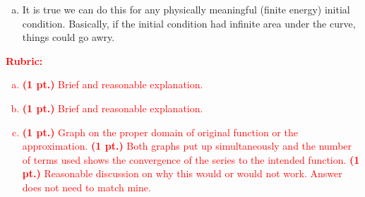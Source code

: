 \documentclass[12pt]{article} %
\begin{document}
\begin{solution}
\begin{enumerate}[(a)]
\item It is true we can do this for any physically meaningful (finite energy) initial condition. Basically, if the initial condition had infinite area under the curve, things could go awry. 
\end{enumerate}
\end{solution}
\vspace*{1cm}
\textcolor{red}{
\noindent \textbf{Rubric:}
\begin{enumerate}[(a)]
    \item \textbf{(1 pt.)} Brief and reasonable explanation.
    \item \textbf{(1 pt.)} Brief and reasonable explanation.
    \item \textbf{(1 pt.)} Graph on the proper domain of original function or the approximation. \textbf{(1 pt.)} Both graphs put up simultaneously and the number of terms used shows the convergence of the series to the intended function.
	\textbf{(1 pt.)} Reasonable discussion on why this would or would not work. Answer does not need to match mine.
\end{enumerate}
}
\end{document}
